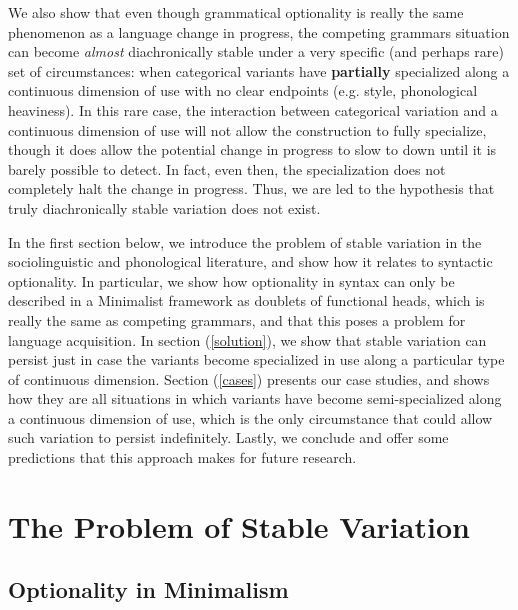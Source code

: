 We also show that even though grammatical optionality is really the same phenomenon as a language change in progress, the competing grammars situation can become \textsl{almost} diachronically stable under a very specific (and perhaps rare) set of circumstances: when categorical variants have \textbf{partially} specialized along a continuous dimension of use with no clear endpoints (e.g. style, phonological heaviness). In this rare case, the interaction between categorical variation and a continuous dimension of use will not allow the construction to fully specialize, though it does allow the potential change in progress to slow to down until it is barely possible to detect. In fact, even then, the specialization does not completely halt the change in progress.
Thus, we are led to the hypothesis that truly diachronically stable variation does not exist.

  
In the first section below, we introduce the problem of stable variation in the sociolinguistic and phonological literature, and show how it relates to syntactic optionality.
In particular, we show how optionality in syntax can only be described in a Minimalist framework as doublets of functional heads, which is really the same as competing grammars, and that this poses a problem for language acquisition.
In section (\ref{solution}), we show that stable variation can persist just in case the variants become specialized in use along a particular type of continuous dimension.
Section (\ref{cases}) presents our case studies, and shows how they are all situations in which variants have become semi-specialized along a continuous dimension of use, which is the only circumstance that could allow such variation to persist indefinitely.
Lastly, we conclude and offer some predictions that this approach makes for future research.


\section{The Problem of Stable Variation}
\subsection{Optionality in Minimalism}


